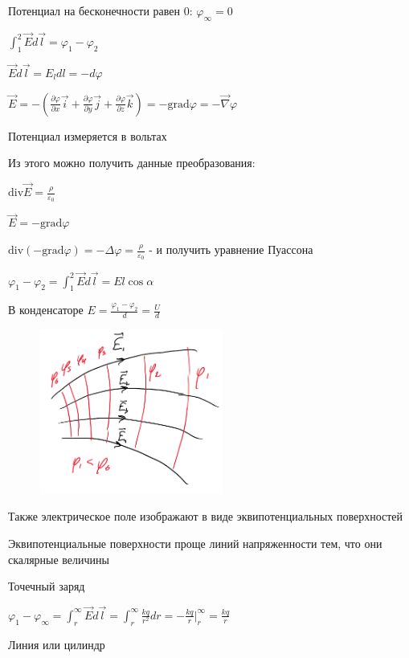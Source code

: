 \documentclass[12pt]{article}
\begin{document}
Потенциал на бесконечности равен 0: $\varphi_\infty = 0$

$\int_1^2 \vec{E} d\vec{l} = \varphi_1 - \varphi_2$

$\vec{E}d\vec{l} = E_l dl = -d\varphi$

$\vec{E} = -(\frac{\partial \varphi}{\partial x}\vec{i} + \frac{\partial \varphi}{\partial y}\vec{j} + \frac{\partial \varphi}{\partial z}\vec{k}) = -\mathrm{grad} \varphi = -\vec{\nabla} \varphi$

Потенциал измеряется в вольтах

Из этого можно получить данные преобразования:

$\mathrm{div} \vec{E} = \frac{\rho}{\varepsilon_0}$

$\vec{E} = -\mathrm{grad} \varphi$

$\mathrm{div}(-\mathrm{grad} \varphi) = -\Delta \varphi = \frac{\rho}{\varepsilon_0}$ - и получить уравнение Пуассона

$\varphi_1 - \varphi_2 = \int_1^2 \vec{E}d\vec{l} = El\cos\alpha$

В конденсаторе $E = \frac{\varphi_1 - \varphi_2}{d} = \frac{U}{d}$

\begin{minipage}{\textwidth}
    \begin{figure}
        \includegraphics[width=6cm]{physics1/images/physics1_2024_11_25_2}
    \end{figure}
    Также электрическое поле изображают в виде эквипотенциальных поверхностей

    Эквипотенциальные поверхности проще линий напряженности тем, что они скалярные величины
\end{minipage}

 Точечный заряд

$\varphi_1 - \varphi_\infty = \int_r^\infty \vec{E}d\vec{l} = \int_r^\infty \frac{kq}{r^2} dr = -\frac{kq}{r} \Big|_r^\infty = \frac{kq}{r}$

 Линия или цилиндр
\end{document}
